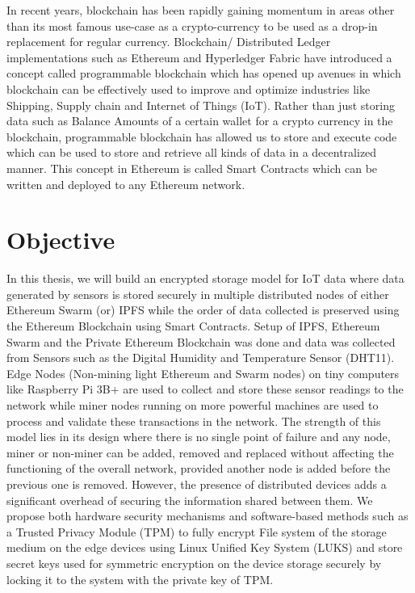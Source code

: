 \documentclass[11pt,openright]{report}
\begin{document}
In recent years, blockchain has been rapidly gaining momentum in areas other than its most famous use-case as a crypto-currency to be used as a drop-in replacement for regular currency. Blockchain/ Distributed Ledger implementations such as Ethereum and Hyperledger Fabric have introduced a concept called programmable blockchain which has opened up avenues in which blockchain can be effectively used to improve and optimize industries like Shipping, Supply chain and Internet of Things (IoT). Rather than just storing data such as Balance Amounts of a certain wallet for a crypto currency in the blockchain, programmable blockchain has allowed us to store and execute code which can be used to store and retrieve all kinds of data in a decentralized manner. This concept in Ethereum is called Smart Contracts which can be written and deployed to any Ethereum network.




\section{Objective}\label{section:objective}
In this thesis, we will build an encrypted storage model for IoT data where data generated by sensors is stored securely in multiple distributed nodes of either Ethereum Swarm (or) IPFS while the order of data collected is preserved using the Ethereum Blockchain using Smart Contracts. Setup of IPFS, Ethereum Swarm and the Private Ethereum Blockchain was done and data was collected from Sensors such as the Digital Humidity and Temperature Sensor (DHT11). Edge Nodes (Non-mining light Ethereum and Swarm nodes) on tiny computers like Raspberry Pi 3B+ are used to collect and store these sensor readings to the network while miner nodes running on more powerful machines are used to process and validate these transactions in the network. The strength of this model lies in its design where there is no single point of failure and any node, miner or non-miner can be added, removed and replaced without affecting the functioning of the overall  network, provided another node is added before the previous one is removed. However, the presence of distributed devices adds a significant overhead of securing the information shared between them. We propose both hardware security mechanisms and software-based methods such as a Trusted Privacy Module (TPM) to fully encrypt File system of the storage medium on the edge devices using Linux Unified Key System (LUKS) and store secret keys used for symmetric encryption on the device storage securely by locking it to the system with the private key of TPM.
\end{document}
